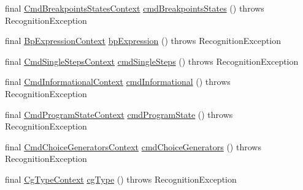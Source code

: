 \begin{DoxyCompactItemize}
\item 
final \hyperlink{classgov_1_1nasa_1_1jpf_1_1inspector_1_1client_1_1parser_1_1_console_grammar_parser_1_1_cmd_breakpoints_states_context}{Cmd\+Breakpoints\+States\+Context} \hyperlink{classgov_1_1nasa_1_1jpf_1_1inspector_1_1client_1_1parser_1_1_console_grammar_parser_abd27b1db1328d8dcd4f5b25cd4db0407}{cmd\+Breakpoints\+States} ()  throws Recognition\+Exception 
\item 
final \hyperlink{classgov_1_1nasa_1_1jpf_1_1inspector_1_1client_1_1parser_1_1_console_grammar_parser_1_1_bp_expression_context}{Bp\+Expression\+Context} \hyperlink{classgov_1_1nasa_1_1jpf_1_1inspector_1_1client_1_1parser_1_1_console_grammar_parser_af8f413ff85d64783d9625af4ca4b1f06}{bp\+Expression} ()  throws Recognition\+Exception 
\item 
final \hyperlink{classgov_1_1nasa_1_1jpf_1_1inspector_1_1client_1_1parser_1_1_console_grammar_parser_1_1_cmd_single_steps_context}{Cmd\+Single\+Steps\+Context} \hyperlink{classgov_1_1nasa_1_1jpf_1_1inspector_1_1client_1_1parser_1_1_console_grammar_parser_a38d3ee70cf1cb2a77d6de42788941648}{cmd\+Single\+Steps} ()  throws Recognition\+Exception 
\item 
final \hyperlink{classgov_1_1nasa_1_1jpf_1_1inspector_1_1client_1_1parser_1_1_console_grammar_parser_1_1_cmd_informational_context}{Cmd\+Informational\+Context} \hyperlink{classgov_1_1nasa_1_1jpf_1_1inspector_1_1client_1_1parser_1_1_console_grammar_parser_ae35d1b2783eeb9483c0c5473bd4017e4}{cmd\+Informational} ()  throws Recognition\+Exception 
\item 
final \hyperlink{classgov_1_1nasa_1_1jpf_1_1inspector_1_1client_1_1parser_1_1_console_grammar_parser_1_1_cmd_program_state_context}{Cmd\+Program\+State\+Context} \hyperlink{classgov_1_1nasa_1_1jpf_1_1inspector_1_1client_1_1parser_1_1_console_grammar_parser_ad1e3d393488b8ab29c12899535ecf1cd}{cmd\+Program\+State} ()  throws Recognition\+Exception 
\item 
final \hyperlink{classgov_1_1nasa_1_1jpf_1_1inspector_1_1client_1_1parser_1_1_console_grammar_parser_1_1_cmd_choice_generators_context}{Cmd\+Choice\+Generators\+Context} \hyperlink{classgov_1_1nasa_1_1jpf_1_1inspector_1_1client_1_1parser_1_1_console_grammar_parser_ae1f2f3e73caeaccbd742f2842d4c986a}{cmd\+Choice\+Generators} ()  throws Recognition\+Exception 
\item 
final \hyperlink{classgov_1_1nasa_1_1jpf_1_1inspector_1_1client_1_1parser_1_1_console_grammar_parser_1_1_cg_type_context}{Cg\+Type\+Context} \hyperlink{classgov_1_1nasa_1_1jpf_1_1inspector_1_1client_1_1parser_1_1_console_grammar_parser_ae6e3125de4230c77d8a95cd8064e96d7}{cg\+Type} ()  throws Recognition\+Exception 

\end{DoxyCompactItemize}
